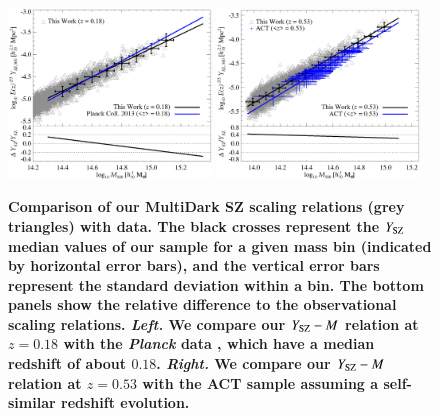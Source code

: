 \documentclass[useAMS,usenatbib]{mn2e}
\begin{document}
\begin{figure} 
\centering
\includegraphics[width=0.48\textwidth]{figures/sz_m.eps}
\includegraphics[width=0.48\textwidth]{figures/sz_m_ACT.eps}
\caption{{\bf Comparison of our MultiDark SZ scaling relations (grey triangles)
    with data. The black crosses represent the $Y_{{\mathrm{SZ}}}$ median values of
    our sample for a given mass bin (indicated by horizontal error bars), and
    the vertical error bars represent the standard deviation within a bin.  The
    bottom panels show the relative difference to the observational scaling
    relations.  \emph{Left.}  We compare our $Y_{{\mathrm{SZ}}}-M$ relation at
    $z=0.18$ with the {\em Planck} data \citep[blue,][]{2013arXiv1303.5080P},
    which have a median redshift of about $0.18$. \emph{Right.} We compare our
    $Y_{{\mathrm{SZ}}}-M$ relation at $z=0.53$ with the ACT sample
    \protect\citep[blue,][]{2013JCAP...07..008H} assuming a self-similar
    redshift evolution.}}
\label{fig:SZ_M}
\end{figure}
\end{document}
